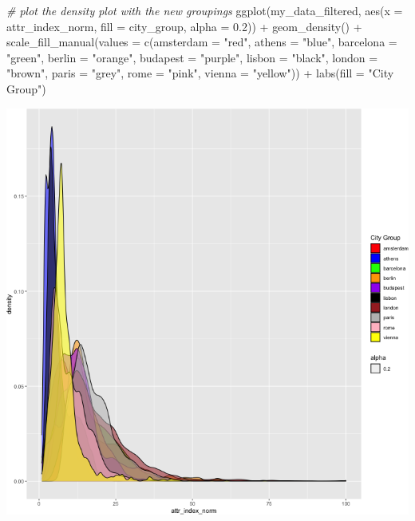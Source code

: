 \documentclass[
]{article}
\newenvironment{Shaded}{\begin{snugshade}}{\end{snugshade}}
\newcommand{\AttributeTok}[1]{\textcolor[rgb]{0.77,0.63,0.00}{#1}}
\newcommand{\CommentTok}[1]{\textcolor[rgb]{0.56,0.35,0.01}{\textit{#1}}}
\newcommand{\FloatTok}[1]{\textcolor[rgb]{0.00,0.00,0.81}{#1}}
\newcommand{\FunctionTok}[1]{\textcolor[rgb]{0.00,0.00,0.00}{#1}}
\newcommand{\NormalTok}[1]{#1}
\newcommand{\SpecialCharTok}[1]{\textcolor[rgb]{0.00,0.00,0.00}{#1}}
\newcommand{\StringTok}[1]{\textcolor[rgb]{0.31,0.60,0.02}{#1}}
\begin{document}
\begin{Shaded}
\begin{Highlighting}[]
\CommentTok{\# plot the density plot with the new groupings}
\FunctionTok{ggplot}\NormalTok{(my\_data\_filtered, }\FunctionTok{aes}\NormalTok{(}\AttributeTok{x =}\NormalTok{ attr\_index\_norm, }\AttributeTok{fill =}\NormalTok{ city\_group,}
    \AttributeTok{alpha =} \FloatTok{0.2}\NormalTok{)) }\SpecialCharTok{+} \FunctionTok{geom\_density}\NormalTok{() }\SpecialCharTok{+} \FunctionTok{scale\_fill\_manual}\NormalTok{(}\AttributeTok{values =} \FunctionTok{c}\NormalTok{(}\AttributeTok{amsterdam =} \StringTok{"red"}\NormalTok{,}
    \AttributeTok{athens =} \StringTok{"blue"}\NormalTok{, }\AttributeTok{barcelona =} \StringTok{"green"}\NormalTok{, }\AttributeTok{berlin =} \StringTok{"orange"}\NormalTok{,}
    \AttributeTok{budapest =} \StringTok{"purple"}\NormalTok{, }\AttributeTok{lisbon =} \StringTok{"black"}\NormalTok{, }\AttributeTok{london =} \StringTok{"brown"}\NormalTok{,}
    \AttributeTok{paris =} \StringTok{"grey"}\NormalTok{, }\AttributeTok{rome =} \StringTok{"pink"}\NormalTok{, }\AttributeTok{vienna =} \StringTok{"yellow"}\NormalTok{)) }\SpecialCharTok{+} \FunctionTok{labs}\NormalTok{(}\AttributeTok{fill =} \StringTok{"City Group"}\NormalTok{)}
\end{Highlighting}
\end{Shaded}

\includegraphics{Project_files/figure-latex/unnamed-chunk-31-1.png}
\end{document}
